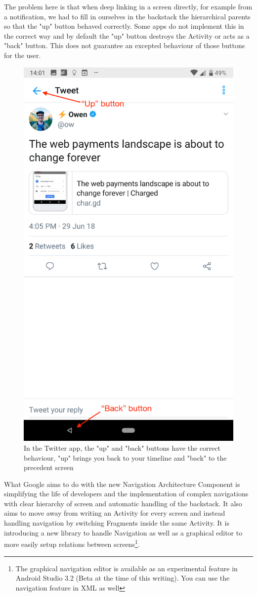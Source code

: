 \documentclass[11pt,a4paper]{report}
\begin{document}
The problem here is that when deep linking in a screen directly, for example from a notification, we had to fill in ourselves in the backstack the hierarchical parents so that the "up" button behaved correctly. Some apps do not implement this in the correct way and by default the "up" button destroys the Activity or acts as a "back" button. This does not guarantee an excepted behaviour of those buttons for the user.\\

\begin{figure}[H]
\begin{center}
	\includegraphics[width=.5\textwidth]{assets/twitter_app_up_back}
	\caption[Up and Back buttons in Twitter app]{In the Twitter app, the "up" and "back" buttons have the correct behaviour, "up" brings you back to your timeline and "back" to the precedent screen}
	\label{twitter_up_back_img}
\end{center}
\end{figure}

What Google aims to do with the new Navigation Architecture Component\cite{android:doc:jetpack:navigation} is simplifying the life of developers and the implementation of complex navigations with clear hierarchy of screen and automatic handling of the backstack\cite{android:video:io2018:navigation}. It also aims to move away from writing an Activity for every screen and instead handling navigation by switching Fragments inside the same Activity. It is introducing a new library to handle Navigation as well as a graphical editor to more easily setup relations between screens\footnote{The graphical navigation editor is available as an experimental feature in Android Studio 3.2 (Beta at the time of this writing). You can use the navigation feature in XML as well}.\\
\end{document}
